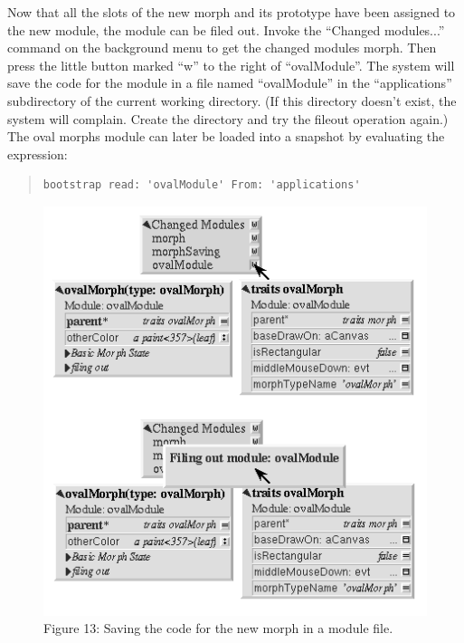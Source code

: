 \documentclass[letterpaper,10pt,english]{sphinxmanual}
\begin{document}
Now that all the slots of the new morph and its prototype have been assigned to the new module, the module can be filed out. Invoke the ``Changed modules...'' command on the background menu to get the changed modules morph. Then press the little button marked ``w'' to the right of ``ovalModule''. The system will save the code for the module in a file named ``ovalModule'' in the ``applications'' subdirectory of the current working directory. (If this directory doesn't exist, the system will complain. Create the directory and try the fileout operation again.) The oval morphs module can later be loaded into a snapshot by evaluating the expression:
\begin{quote}

\begin{Verbatim}[commandchars=\\\{\}]
bootstrap read: 'ovalModule' From: 'applications'
\end{Verbatim}
\end{quote}
\begin{figure}[htbp]\begin{flushleft}
\capstart

\includegraphics{Figure13.png}
\caption{Figure 13: Saving the code for the new morph in a module file.}\end{flushleft}\end{figure}
\end{document}
